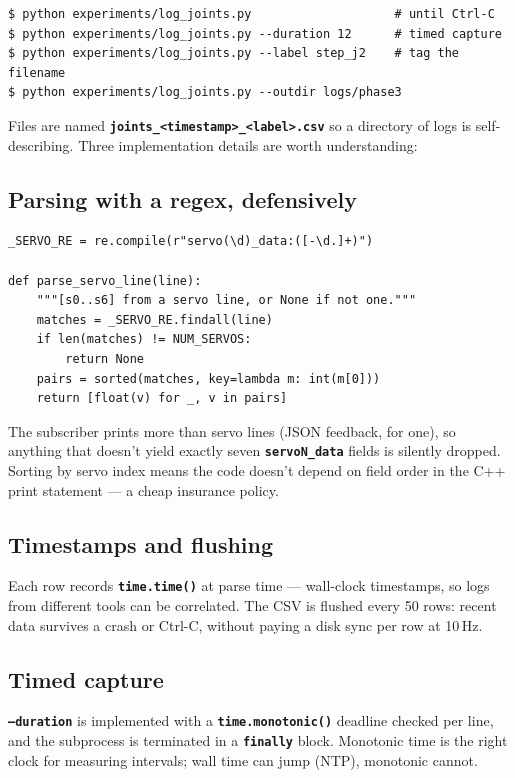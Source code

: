\documentclass[11pt,twoside,openright]{book}
\newcommand{\code}[1]{\texttt{\bfseries #1}}
\newcommand{\codefile}[1]{%
  \par\vspace{10pt}\noindent{\ttfamily\small\bfseries #1}\par\nopagebreak\vspace{-8pt}}
\begin{document}
\begin{lstlisting}
$ python experiments/log_joints.py                    # until Ctrl-C
$ python experiments/log_joints.py --duration 12      # timed capture
$ python experiments/log_joints.py --label step_j2    # tag the filename
$ python experiments/log_joints.py --outdir logs/phase3
\end{lstlisting}

Files are named \code{joints\_<timestamp>\_<label>.csv} so a directory of
logs is self-describing. Three implementation details are worth
understanding:

\subsection{Parsing with a regex, defensively}

\codefile{experiments/log\_joints.py}
\begin{lstlisting}[style=pktpython]
_SERVO_RE = re.compile(r"servo(\d)_data:([-\d.]+)")

def parse_servo_line(line):
    """[s0..s6] from a servo line, or None if not one."""
    matches = _SERVO_RE.findall(line)
    if len(matches) != NUM_SERVOS:
        return None
    pairs = sorted(matches, key=lambda m: int(m[0]))
    return [float(v) for _, v in pairs]
\end{lstlisting}

The subscriber prints more than servo lines (JSON feedback, for one), so
anything that doesn't yield exactly seven \code{servoN\_data} fields is
silently dropped. Sorting by servo index means the code doesn't depend on
field order in the C++ print statement --- a cheap insurance policy.

\subsection{Timestamps and flushing}

Each row records \code{time.time()} at parse time --- wall-clock
timestamps, so logs from different tools can be correlated. The CSV is
flushed every 50 rows: recent data survives a crash or Ctrl-C, without
paying a disk sync per row at 10\,Hz.

\subsection{Timed capture}

\code{--duration} is implemented with a \code{time.monotonic()} deadline
checked per line, and the subprocess is terminated in a \code{finally}
block. Monotonic time is the right clock for measuring intervals; wall
time can jump (NTP), monotonic cannot.
\end{document}

